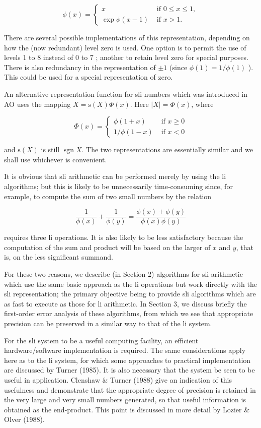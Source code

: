 \documentclass[10pt]{article}
\begin{document}
$$
\phi(x)= \begin{cases}x & \text { if } 0 \leqslant x \leqslant 1, \\ \exp \phi(x-1) & \text { if } x>1 .\end{cases}
$$

There are several possible implementations of this representation, depending on how the (now redundant) level zero is used. One option is to permit the use of levels 1 to 8 instead of 0 to 7 ; another to retain level zero for special purposes. There is also redundancy in the representation of $\pm 1$ (since $\phi(1)=1 / \phi(1)$ ). This could be used for a special representation of zero.

An alternative representation function for sli numbers which was introduced in AO uses the mapping $X=\mathrm{s}(X) \Phi(x)$. Here $|X|=\Phi(x)$, where

$$
\Phi(x)= \begin{cases}\phi(1+x) & \text { if } x \geqslant 0 \\ 1 / \phi(1-x) & \text { if } x<0\end{cases}
$$

and $\mathrm{s}(X)$ is still $\operatorname{sgn} X$. The two representations are essentially similar and we shall use whichever is convenient.

It is obvious that sli arithmetic can be performed merely by using the li algorithms; but this is likely to be unnecessarily time-consuming since, for example, to compute the sum of two small numbers by the relation

$$
\frac{1}{\phi(x)}+\frac{1}{\phi(y)}=\frac{\phi(x)+\phi(y)}{\phi(x) \phi(y)}
$$

requires three li operations. It is also likely to be less satisfactory because the computation of the sum and product will be based on the larger of $x$ and $y$, that is, on the less significant summand.

For these two reasons, we describe (in Section 2) algorithms for sli arithmetic which use the same basic approach as the li operations but work directly with the sli representation; the primary objective being to provide sli algorithms which are as fast to execute as those for li arithmetic. In Section 3, we discuss briefly the first-order error analysis of these algorithms, from which we see that appropriate precision can be preserved in a similar way to that of the li system.

For the sli system to be a useful computing facility, an efficient hardware/software implementation is required. The same considerations apply here as to the li system, for which some approaches to practical implementation are discussed by Turner (1985). It is also necessary that the system be seen to be useful in application. Clenshaw \& Turner (1988) give an indication of this usefulness and demonstrate that the appropriate degree of precision is retained in the very large and very small numbers generated, so that useful information is obtained as the end-product. This point is discussed in more detail by Lozier \& Olver (1988).
\end{document}
